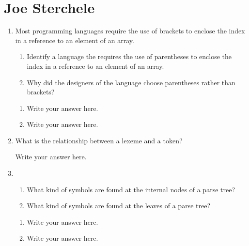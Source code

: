 \chapter{Joe Sterchele}

\begin{enumerate}
  \item Most programming languages require the use of brackets to
    enclose the index in a reference to an element of an array.
  \begin{enumerate}
    \item Identify a language the requires the use of parentheses
      to enclose the index in a reference to an element of an array.
    \item Why did the designers of the language choose parentheses
      rather than brackets?
    \end{enumerate}

  \begin{answer}

  \begin{enumerate}
    \item Write your answer here.
    \item Write your answer here.
    \end{enumerate}

    \end{answer}
    
  \item What is the relationship between a lexeme and a token?

  \begin{answer}

    Write your answer here.

    \end{answer}

  \item
  \begin{enumerate}
    \item What kind of symbols are found at the internal nodes of a
      parse tree?
    \item What kind of symbols are found at the leaves of a parse tree?
    \end{enumerate}

  \begin{answer}

  \begin{enumerate}
    \item Write your answer here.
    \item Write your answer here.
    \end{enumerate}


\end{answer}
\end{enumerate}
